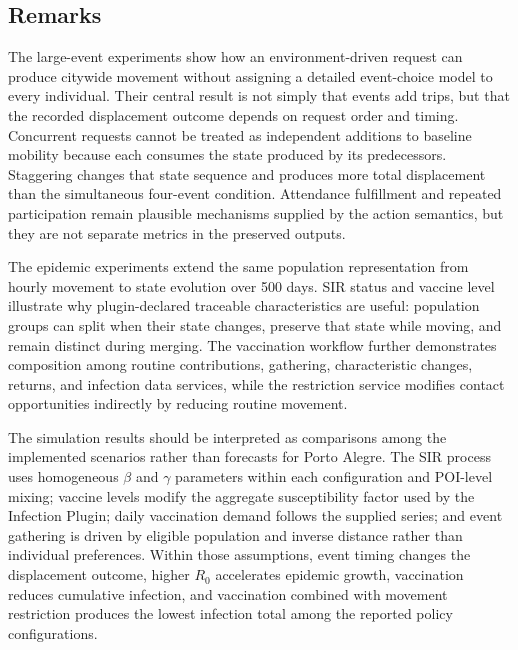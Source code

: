 \FloatBarrier

\subsection{Remarks}

The large-event experiments show how an environment-driven request can produce citywide movement without assigning a detailed event-choice model to every individual. Their central result is not simply that events add trips, but that the recorded displacement outcome depends on request order and timing. Concurrent requests cannot be treated as independent additions to baseline mobility because each consumes the state produced by its predecessors. 
Staggering changes that state sequence and produces more total displacement than the simultaneous four-event condition. Attendance fulfillment and repeated participation remain plausible mechanisms supplied by the action semantics, but they are not separate metrics in the preserved outputs.

The epidemic experiments extend the same population representation from hourly movement to state evolution over 500 days. SIR status and vaccine level illustrate why plugin-declared traceable characteristics are useful: population groups can split when their state changes, preserve that state while moving, and remain distinct during merging. The vaccination workflow further demonstrates composition among routine contributions, gathering, characteristic changes, returns, and infection data services, while the restriction service modifies contact opportunities indirectly by reducing routine movement.

The simulation results should be interpreted as comparisons among the implemented scenarios rather than forecasts for Porto Alegre. The SIR process uses homogeneous $\beta$ and $\gamma$ parameters within each configuration and POI-level mixing; vaccine levels modify the aggregate susceptibility factor used by the Infection Plugin; daily vaccination demand follows the supplied series; and event gathering is driven by eligible population and inverse distance rather than individual preferences. Within those assumptions, event timing changes the displacement outcome, higher $R_0$ accelerates epidemic growth, vaccination reduces cumulative infection, and vaccination combined with movement restriction produces the lowest infection total among the reported policy configurations.

